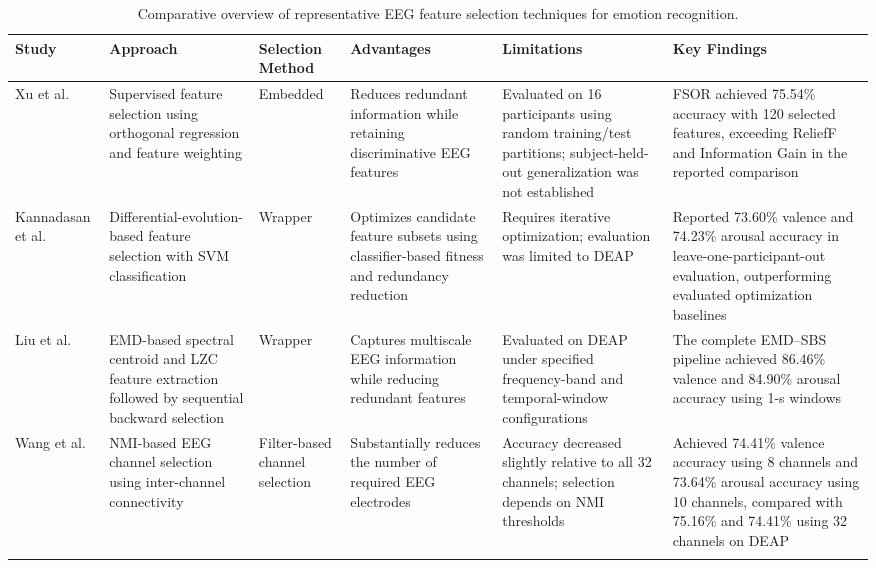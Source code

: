 \documentclass[ASNA,twocolumn]{USG}
\newcommand{\lightrowsep}{%
  \arrayrulecolor{lightrowgray}%
  \specialrule{0.30pt}{3.5pt}{3.5pt}%
  \arrayrulecolor{black}%
}
\begin{document}
\begin{table}[tp]
\centering
\small
\setlength{\tabcolsep}{2pt}
\renewcommand{\arraystretch}{1.07}

\caption{Comparative overview of representative EEG feature
selection techniques for emotion recognition.}
\label{tab:eeg_feature_selection_summary}

\begin{tabular}{
>{\raggedright\arraybackslash}p{}
>{\raggedright\arraybackslash}p{}
>{\raggedright\arraybackslash}p{}
>{\raggedright\arraybackslash}p{}
>{\raggedright\arraybackslash}p{}
>{\raggedright\arraybackslash}p{}
}

\toprule
\textbf{Study} &
\textbf{Approach} &
\textbf{Selection Method} &
\textbf{Advantages} &
\textbf{Limitations} &
\textbf{Key Findings} \\
\midrule

Xu et al.~\cite{xu2020eeg} &
Supervised feature selection using
orthogonal regression and feature weighting &
Embedded &
Reduces redundant information while
retaining discriminative EEG features &
Evaluated on 16 participants using
random training/test partitions;
subject-held-out generalization
was not established &
FSOR achieved 75.54\% accuracy
with 120 selected features,
exceeding ReliefF and Information
Gain in the reported comparison \\
\lightrowsep

Kannadasan et al.~\cite{kannadasan2023eeg} &
Differential-evolution-based feature
selection with SVM classification &
Wrapper &
Optimizes candidate feature subsets
using classifier-based fitness
and redundancy reduction &
Requires iterative optimization;
evaluation was limited to DEAP &
Reported 73.60\% valence and
74.23\% arousal accuracy in
leave-one-participant-out evaluation,
outperforming evaluated optimization
baselines \\
\lightrowsep

Liu et al.~\cite{liu2018electroencephalogram} &
EMD-based spectral centroid and LZC
feature extraction followed by
sequential backward selection &
Wrapper &
Captures multiscale EEG information
while reducing redundant features &
Evaluated on DEAP under specified
frequency-band and temporal-window
configurations &
The complete EMD--SBS pipeline
achieved 86.46\% valence and
84.90\% arousal accuracy
using 1-s windows \\
\lightrowsep

Wang et al.~\cite{wang2019channel} &
NMI-based EEG channel selection
using inter-channel connectivity &
Filter-based
channel selection &
Substantially reduces the number
of required EEG electrodes &
Accuracy decreased slightly
relative to all 32 channels;
selection depends on NMI thresholds &
Achieved 74.41\% valence accuracy
using 8 channels and 73.64\%
arousal accuracy using 10 channels,
compared with 75.16\% and 74.41\%
using 32 channels on DEAP \\
\lightrowsep


\end{tabular}
\end{table}
\end{document}
